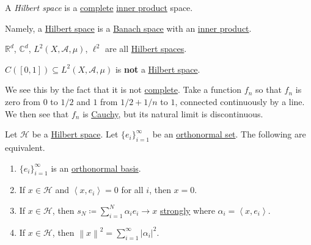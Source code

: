 \begin{definition}\label{def:Hilbert-space}
	A \emph{Hilbert space} is a \hyperref[def:complete]{complete} \hyperref[def:inner-product]{inner product} space.
\end{definition}
\begin{note}
	Namely, a \hyperref[def:Hilbert-space]{Hilbert space} is a \hyperref[def:Banach-space]{Banach space} with an \hyperref[def:inner-product]{inner product}.
\end{note}

\begin{eg}
	\(\mathbb{R}^d\), \(\mathbb{C}^d\), \(L^2(X,\mathcal{A},\mu)\), \(\ell^2\) are all \hyperref[def:Hilbert-space]{Hilbert spaces}.
\end{eg}

\begin{eg}
	\(C([0,1]) \subseteq L^2(X,\mathcal{A},\mu)\) is \textbf{not} a \hyperref[def:Hilbert-space]{Hilbert space}.
\end{eg}
\begin{explanation}
	We see this by the fact that it is not \hyperref[def:complete]{complete}. Take a function \(f_n\) so that \(f_n\) is zero from \(0\) to \(1/2\)
	and \(1\) from \(1/2 + 1/n\) to \(1\), connected continuously by a line. We then see that \(f_{n}\) is \hyperref[def:Cauchy-sequence]{Cauchy},
	but its natural limit is discontinuous.
\end{explanation}

\begin{theorem}\label{thm:lec-38}
	Let \(\mathcal{H}\) be a \hyperref[def:Hilbert-space]{Hilbert space}. Let \(\{e_i\}_{i=1}^\infty\) be an \hyperref[def:orthonormal-set]{orthonormal set}. The following are equivalent.
	\begin{enumerate}[(1)]
		\item \(\{e_i\}_{i=1}^\infty\) is an \hyperref[def:orthonormal-basis]{orthonormal basis}.
		\item If \(x \in \mathcal{H}\) and \(\left< x,e_i \right> = 0\) for all \(i\), then \(x = 0\).
		\item If \(x \in \mathcal{H}\), then \(s_N \coloneqq \sum_{i=1}^N \alpha_i e_i \to x\) \hyperref[def:strong-convergence]{strongly} where \(\alpha_i = \left< x,e_i \right>\).
		\item If \(x \in \mathcal{H}\), then \(\left\lVert x\right\rVert^2 = \sum_{i=1}^\infty \left\vert \alpha_i \right\vert ^2\).
	\end{enumerate}
\end{theorem}

